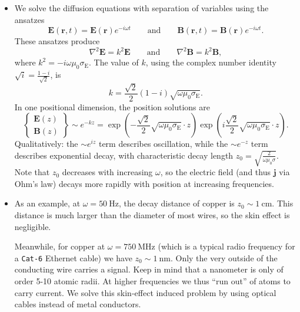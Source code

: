\documentclass[11pt, a4paper]{article}
\newcommand{\eqtext}[1]{\qquad \text{#1} \qquad}
\renewcommand{\vec}[1]{\bm{#1}} %
\renewcommand{\r}{\vec{r}}
\newcommand{\E}{\vec{E}} %
\newcommand{\B}{\vec{B}} %
\newcommand{\mm}{\mu_{0}}  %
\renewcommand{\j}{\vec{j}}  %
\renewcommand{\laplacian}{\nabla^{2}}
\begin{document}
\begin{itemize}
	\item We solve the diffusion equations with separation of variables using the ansatzes
	\begin{equation*}
		\E(\r, t) = \E(\r)e^{-i\omega t} \eqtext{and} \B(\r, t) = \B(\r)e^{-i\omega t}.
	\end{equation*}
	These ansatzes produce
	\begin{equation*}
		\laplacian \E = k^{2} \E \eqtext{and} \laplacian \B = k^{2} \B,
	\end{equation*}
	where $ k^{2} = -i \omega \mm \sigma_{\text{E}} $. The value of $ k $, using the complex number identity $ \sqrt{i} = \frac{1-i}{\sqrt{2}} $, is
	\begin{equation*}
		k = \frac{\sqrt{2}}{2}(1 - i) \sqrt{\omega \mm \sigma_{\text{E}}}.
	\end{equation*}
	In one positional dimension, the position solutions are
	\begin{equation*}
		\begin{Bmatrix}
            \E(z)\\
            \B(z)
		\end{Bmatrix}
        \sim e^{-kz} = \exp\left(- \frac{\sqrt{2}}{2}\sqrt{\omega \mm \sigma_{\text{E}}}\cdot z\right)\exp\left(i \frac{\sqrt{2}}{2}\sqrt{\omega \mm \sigma_{\text{E}}}\cdot z\right).
	\end{equation*}
	Qualitatively: the $ \sim e^{iz} $ term describes oscillation, while the $ \sim e^{-z} $ term describes exponential decay, with characteristic decay length $ z_{0} = \sqrt{\frac{2}{\omega \mm \sigma}} $. Note that $ z_{0} $ decreases with increasing $ \omega $, so the electric field (and thus $ \j $ via Ohm's law) decays more rapidly with position at increasing frequencies. 
	
	\item As an example, at $ \omega = \SI{50}{\hertz} $, the decay distance of copper is $ z_{0} \sim \SI{1}{\centi \meter} $. This distance is much larger than the diameter of most wires, so the skin effect is negligible.
	
	Meanwhile, for copper at $ \omega = \SI{750}{\mega \hertz} $ (which is a typical radio frequency for a \texttt{Cat-6} Ethernet cable) we have $ z_{0} \sim \SI{1}{\nano \meter} $. Only the very outside of the conducting wire carries a signal. Keep in mind that a nanometer is only of order 5-10 atomic radii. At higher frequencies we thus ``run out'' of atoms to carry current. We solve this skin-effect induced problem by using optical cables instead of metal conductors.
	
\end{itemize}
\end{document}
